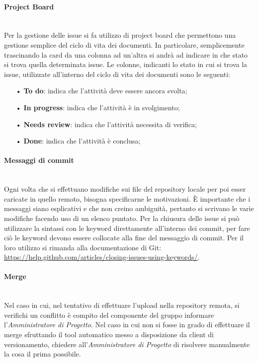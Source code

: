{\paragraph{Project Board}\mbox{}\\
\label{sec:projectboard}
Per la gestione delle {issue} si fa utilizzo di {project board} che permettono una gestione semplice del ciclo di vita dei documenti. 
In particolare, semplicemente trascinando la {card} da una colonna ad un'altra si andrà ad indicare in che stato si trova quella determinata issue.
Le colonne, indicanti lo stato in cui si trova la issue, utilizzate all'interno del ciclo di vita dei documenti sono le seguenti:
\begin{itemize}
\item[•] \textbf{To do}: indica che l'attività deve essere ancora svolta;
\item[•] \textbf{In progress}: indica che l'attività è in svolgimento;
\item[•] \textbf{Needs review}: indica che l'attività necessita di verifica;
\item[•] \textbf{Done}: indica che l'attività è conclusa;
\end{itemize}
\paragraph{Messaggi di commit}\mbox{}\\
Ogni volta che si effettuano modifiche sui file del repository locale per poi esser caricate in
quello remoto, bisogna specificarne le motivazioni. \uppercase{è} importante che i messaggi siano esplicativi e che non creino ambiguità, pertanto si scrivano le varie modifiche facendo uso di un elenco puntato.
Per la chiusura delle issue si può utilizzare la sintassi con le {keyword} direttamente all'interno dei {commit}, per fare ciò le keyword devono essere collocate alla fine del messaggio di commit. Per il loro utilizzo si rimanda alla documentazione di {Git}: \url{https://help.github.com/articles/closing-issues-using-keywords/}. 

\paragraph{Merge}\mbox{}\\
Nel caso in cui, nel tentativo di effettuare l'upload nella repository remota, si verifichi un {conflitto} è compito del componente del gruppo informare l'\textit{Amministratore di Progetto}. Nel caso in cui non si fosse in grado di effettuare il {merge} sfruttando il tool automatico messo a disposizione da client di versionamento, chiedere all'\textit{Amministratore di Progetto} di risolvere manualmente la cosa il prima possibile.
}
